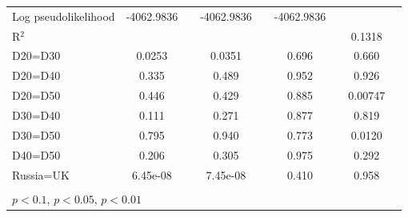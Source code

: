 \begin{tabular}{l|cccccc|cc}
Log pseudolikelihood  &  -4062.9836  &         &       -4062.9836            &         &    -4062.9836               &         &           &   \\ 
R$^2$      &                  &         &                  &         &                  &         &        0.1318   &   \\ 
D20=D30         &   0.0253         &         &   0.0351         &         &    0.696         &         &    0.660         &         \\
D20=D40         &    0.335         &         &    0.489         &         &    0.952         &         &    0.926         &         \\
D20=D50         &    0.446         &         &    0.429         &         &    0.885         &         &  0.00747         &         \\
D30=D40         &    0.111         &         &    0.271         &         &    0.877         &         &    0.819         &         \\
D30=D50         &    0.795         &         &    0.940         &         &    0.773         &         &   0.0120         &         \\
D40=D50         &    0.206         &         &    0.305         &         &    0.975         &         &    0.292         &         \\
Russia=UK       & 6.45e-08         &         & 7.45e-08         &         &    0.410         &         &    0.958         &         \\
\hline\hline
\multicolumn{9}{p{16cm}}{\tiny }\\
\multicolumn{9}{l}{\tiny \sym{*} \(p<0.1\), \sym{**} \(p<0.05\), \sym{***} \(p<0.01\)}\\
\end{tabular}